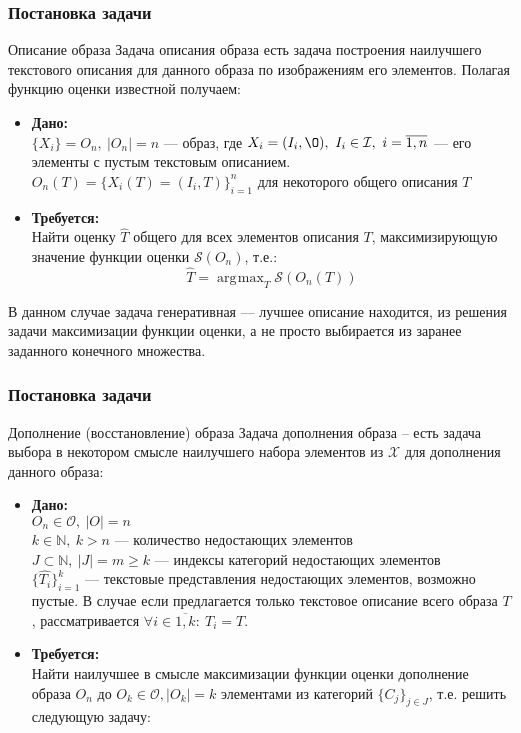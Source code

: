 \documentclass[10pt]{beamer}
\DeclareMathOperator*{\argmax}{\arg\!\max}
\begin{document}
\begin{frame}
	\frametitle{Постановка задачи}
	\begin{block}{Описание образа}
		Задача описания образа есть задача построения наилучшего текстового описания для данного образа по изображениям его элементов. Полагая функцию оценки известной получаем:\\
		\begin{itemize}
			\item \textbf{Дано:}\\
			$\{X_i\} = O_n, ~|O_n| = n$ --- образ, где $X_i = (I_i, \O),~I_i\in\mathcal{I},~i=\overline{1, n}$ --- его элементы с пустым текстовым описанием. \\
			$O_n(T) = \{X_i(T) = (I_i, T)\}_{i=1}^n$ для некоторого общего описания $T$\\
			\item \textbf{Требуется:}\\
			Найти оценку $\hat{T}$ общего для всех элементов описания $T$, максимизирующую значение функции оценки $\mathcal{S}(O_n)$, т.е.: \\
			$$\hat{T}= \argmax_{T}\mathcal{S}(O_n(T))$$
		\end{itemize}
		В данном случае задача генеративная --- лучшее описание находится, из решения задачи максимизации функции оценки, а не просто выбирается из заранее заданного конечного множества.
	\end{block}					
\end{frame}


\begin{frame}
	\frametitle{Постановка задачи}
	\begin{block}{Дополнение (восстановление) образа}
		Задача дополнения образа -- есть задача выбора в некотором смысле наилучшего набора элементов из $\mathcal{X}$ для дополнения данного образа:
		\begin{itemize}
			\item \textbf{Дано:}\\
			$O_n\in\mathcal{O}, ~|O| = n$ \\
			$k \in \mathbb{N}, ~k> n$ --- количество недостающих элементов\\
			$J\subset\mathbb{N},~|J| = m\geqslant k$ --- индексы категорий недостающих элементов\\
			$\{\hat{T_i}\}_{i=1}^k$ --- текстовые представления недостающих элементов, возможно пустые. В случае если предлагается только текстовое описание всего образа $T$, рассматривается $\forall i \in \overline{1,k}: ~T_i = T$.
			
			\item \textbf{Требуется:}\\
			Найти наилучшее в смысле максимизации функции оценки дополнение образа $O_n$ до $O_k\in\mathcal{O}, |O_k|=k$ элементами из категорий $\{C_j\}_{j\in J}$, т.е. решить следующую задачу:
		\end{itemize}
	\end{block}					
\end{frame}
\end{document}
